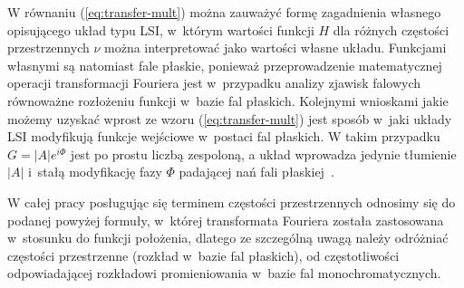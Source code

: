 W równaniu (\ref{eq:transfer-mult}) można zauważyć formę zagadnienia własnego opisującego układ typu LSI, w~którym wartości funkcji $H$ dla różnych częstości przestrzennych $\nu$ można interpretować jako wartości własne układu. Funkcjami własnymi są natomiast fale płaskie, ponieważ przeprowadzenie matematycznej operacji transformacji Fouriera jest w~przypadku analizy zjawisk falowych równoważne rozłożeniu funkcji w~bazie fal płaskich.  Kolejnymi wnioskami jakie możemy uzyskać wprost ze wzoru (\ref{eq:transfer-mult}) jest sposób w~jaki układy LSI modyfikują funkcje wejściowe w~postaci fal płaskich. W takim przypadku $G=|A|e^{i \Phi}$ jest po prostu liczbą zespoloną, a układ wprowadza jedynie tłumienie $|A|$ i~stałą modyfikację fazy $\Phi$ padającej nań fali płaskiej~\cite{citeulike:2926459}.

W całej pracy posługując się terminem częstości przestrzennych odnosimy się do podanej powyżej formuły, w~której transformata Fouriera została zastosowana w~stosunku do funkcji położenia, dlatego ze szczególną uwagą należy odróżniać częstości przestrzenne (rozkład w~bazie fal płaskich), od częstotliwości odpowiadającej rozkładowi promieniowania w~bazie fal monochromatycznych.

